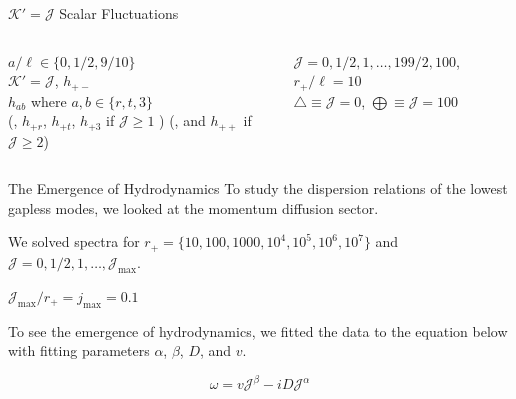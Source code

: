 \documentclass[xcolor=dvipsnames]{beamer}
\begin{document}
\begin{frame}{\(\mathcal K' = \mathcal J\) Scalar Fluctuations}
  \vfill

  \begin{columns}[c]
    \begin{column}{0.5\textwidth}
      \(a/\ell \in \{0, 1/2, 9/10\}\)\\
      \(\mathcal K' = \mathcal J\), 
      \(h_{+-}\) \\ \(h_{ab}\) where
      \(a,b \in \{r,t,3\}\)\\
      (, \(h_{+r}\), \(h_{+t}\), \(h_{+3}\) if \(\mathcal J \geq 1\) ) (, and
      \(h_{++}\) if \(\mathcal J \geq 2\))
    \end{column}

    \begin{column}{0.5\textwidth}
      \(\mathcal J = 0, 1/2, 1, \ldots, 199/2, 100\), \(r_+/\ell = 10\)\\
      \(\bigtriangleup \equiv \mathcal J = 0\),
      \(\bigoplus \equiv \mathcal J = 100\)
    \end{column}
  \end{columns}
\end{frame}

\begin{frame}{The Emergence of Hydrodynamics}
  To study the dispersion relations of the lowest gapless modes, we looked
  at the momentum diffusion sector.

  \vfill

  We solved spectra for
  \(r_+ = \{10, 100, 1000, 10^4 , 10^5 , 10^6 , 10^7 \}\) and
  \(\mathcal J = 0, 1/2, 1, \ldots, \mathcal J_\mathrm{max}\).

  \begin{alertblock}{}
    {\(\mathcal J_\mathrm{max}/r_+ = \mathit j_\mathrm{max} = 0.1\)}
  \end{alertblock}

  \vfill

  To see the emergence of hydrodynamics, we fitted the data to the
  equation below with fitting parameters \(\alpha\), \(\beta\), \(D\), and
  \(v\).

  \vfill

  \begin{equation}
    \omega = v \mathcal J^\beta - i D \mathcal J^\alpha
  \end{equation}
\end{frame}
\end{document}
